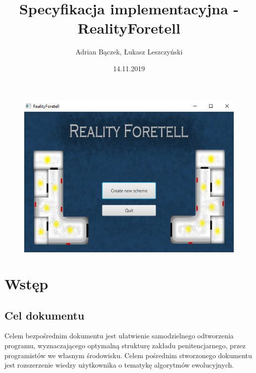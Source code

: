 \documentclass[10pt,oneside]{article}
\title{Specyfikacja implementacyjna - RealityForetell}
\author{Adrian Bączek, Łukasz Leszczyński}
\date{14.11.2019}
\begin{document}
	\maketitle
	
	\begin{center}
		\begin{figure}[!ht]
			\includegraphics[width=0.9\columnwidth]{RealityForetell.png}
		\end{figure}
	\end{center}
	
	
	\thispagestyle{fancy}
	
	\newpage
	
	
	\tableofcontents
	
	\newpage
	
	\section{Wstęp}
	\subsection{Cel dokumentu}
	Celem bezpośrednim dokumentu jest ułatwienie samodzielnego odtworzenia programu, wyznaczającego optymalną strukturę zakładu penitencjarnego, przez programistów we własnym środowisku. Celem pośrednim stworzonego dokumentu jest rozszerzenie wiedzy użytkownika o tematykę algorytmów ewolucyjnych.
\end{document}
